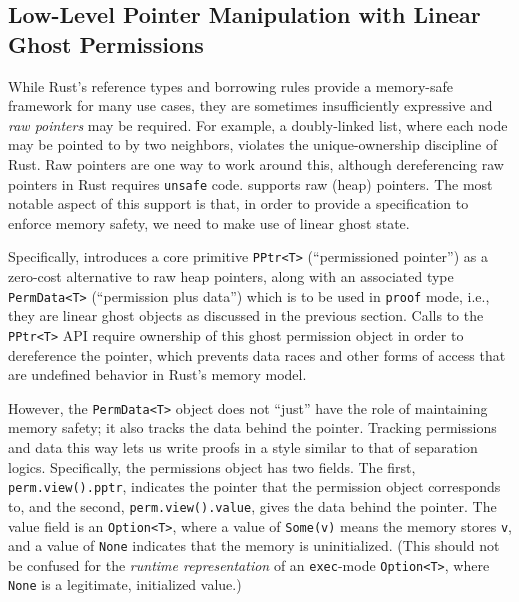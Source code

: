 \subsection{Low-Level Pointer Manipulation with Linear Ghost Permissions}\label{sec:ghost:perms}

While Rust's reference types and borrowing rules provide a memory-safe framework for
many use cases, they are sometimes insufficiently expressive and
\emph{raw pointers} may be required.
For example, a doubly-linked list, where each node may be pointed to by two neighbors,
violates the unique-ownership discipline of Rust. Raw pointers are one way to work around
this, although dereferencing raw pointers in Rust requires \verb`unsafe` code.
\verus supports raw (heap) pointers.
The most notable aspect of this support is that,
in order to provide a specification to enforce memory safety, we need to make use of 
linear ghost state.

Specifically, \verus %
introduces a core primitive
\verb`PPtr<T>` (``permissioned pointer'') as a zero-cost alternative
to raw heap pointers, along
with an associated type \verb`PermData<T>` (``permission plus data'') which is to be used in \verb`proof` mode, i.e., they are linear ghost objects as discussed in the previous section.
Calls to the \verb`PPtr<T>` API require ownership of this ghost permission
object in order to dereference the pointer, which prevents data races and other
forms of access that are undefined behavior in Rust's memory model.

However, the \verb`PermData<T>` object does not ``just'' have the role of maintaining memory safety;
it also tracks the data behind the pointer.
Tracking permissions and data this way lets us write proofs in a style similar to that of separation logics.
Specifically, the permissions object has two fields. The first, \verb`perm.view().pptr`,
indicates the pointer that the permission object corresponds to,
and the second, \verb`perm.view().value`,  gives the data behind the pointer.
The value field is an \verb`Option<T>`,
where a value of \verb`Some(v)` means the memory stores \verb`v`,
and a value of \verb`None` indicates that the memory is uninitialized.
(This should not be confused for the \emph{runtime
representation} of an \verb`exec`-mode \verb`Option<T>`, where \verb`None` is a legitimate, initialized value.)

